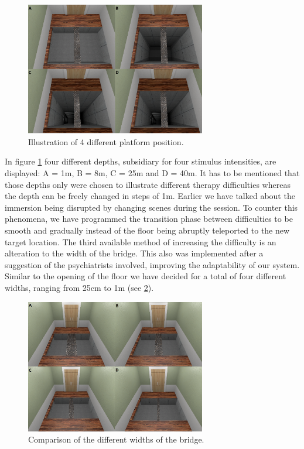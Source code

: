\begin{figure}[ht]
\centering
\includegraphics[width=0.7\textwidth]{images/DepthComparison.png}
\caption{Illustration of 4 different platform position.}
\label{DepthImg}
\end{figure}

In figure \ref{DepthImg} four different depths, subsidiary for four stimulus intensities, are displayed: A = 1m, B = 8m, C = 25m and D = 40m. It has to be mentioned that those depths only were chosen to illustrate different therapy difficulties whereas the depth can be freely changed in steps of 1m. Earlier we have talked about the immersion being disrupted by changing scenes during the session. To counter this phenomena, we have programmed the transition phase between difficulties to be smooth and gradually instead of the floor being abruptly teleported to the new target location. 
The third available method of increasing the difficulty is an alteration to the width of the bridge. This also was implemented after a suggestion of the psychiatrists involved, improving the adaptability of our system. Similar to the opening of the floor we have decided for a total of four different widths, ranging from 25cm to 1m (see \ref{BridgeImg}).

\begin{figure}[ht]
\centering
\includegraphics[width=0.7\textwidth]{images/BridgeComparison.png}
\caption{Comparison of the different widths of the bridge.}
\label{BridgeImg}
\end{figure}

